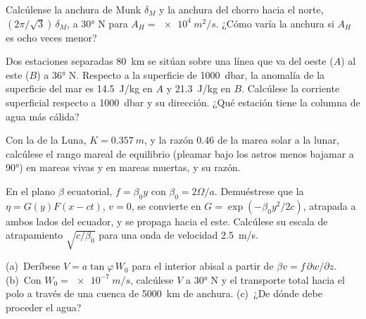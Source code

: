 \begin{exercise}[$\star\star$]\label{exo:b3:ocean-dynamics:7}
Calcúlense la anchura de Munk $\delta_M$ y la anchura del chorro hacia el norte,
$(2\pi/\sqrt3)\,\delta_M$, a \ang{30} N para $A_H = \qty{e4}{m^2/s}$. ¿Cómo
varía la anchura si $A_H$ es ocho veces menor?
\end{exercise}

\begin{exercise}[$\star\star$]\label{exo:b3:ocean-dynamics:8}
Dos estaciones separadas \qty{80}{km} se sitúan sobre una línea que va del oeste ($A$) al este
($B$) a \ang{36} N. Respecto a la superficie de \qty{1000}{dbar}, la
anomalía  de la superficie del mar es \qty{14.5}{J/kg} en $A$ y
\qty{21.3}{J/kg} en $B$. Calcúlese la corriente superficial respecto a
\qty{1000}{dbar} y su dirección. ¿Qué estación tiene la columna de agua
más cálida?
\end{exercise}

\begin{exercise}[$\star\star$]\label{exo:b3:ocean-dynamics:9}
Con la  de la Luna, $K = \qty{0.357}{m}$, y la razón
\num{0.46} de la marea solar a la lunar, calcúlese el rango mareal de equilibrio
(pleamar bajo los astros menos bajamar a \ang{90}) en mareas vivas y en
mareas muertas, y su razón.
\end{exercise}

\begin{exercise}[$\star\star\star$]\label{exo:b3:ocean-dynamics:10}
En el plano $\beta$ ecuatorial, $f = \beta_0y$ con $\beta_0 =
2\Omega/a$. Demuéstrese que la  $\eta = G(y)F(x - ct)$, $v = 0$,
se convierte en $G = \exp(-\beta_0y^2/2c)$, atrapada a ambos lados del ecuador,
y se propaga hacia el este. Calcúlese su escala de atrapamiento $\sqrt{c/\beta_0}$ para una
onda de velocidad \qty{2.5}{m/s}.
\end{exercise}

\begin{exercise}[$\star\star\star$]\label{exo:b3:ocean-dynamics:11}
(a)~Deríbese $V = a\tan\varphi\,W_0$ para el interior abisal a partir de $\beta v =
f\,\partial w/\partial z$. (b)~Con $W_0 = \qty{e-7}{m/s}$, calcúlese $V$ a
\ang{30} N y el transporte total hacia el polo a través de una cuenca
de \qty{5000}{km} de anchura. (c)~¿De dónde debe proceder el agua?
\end{exercise}

